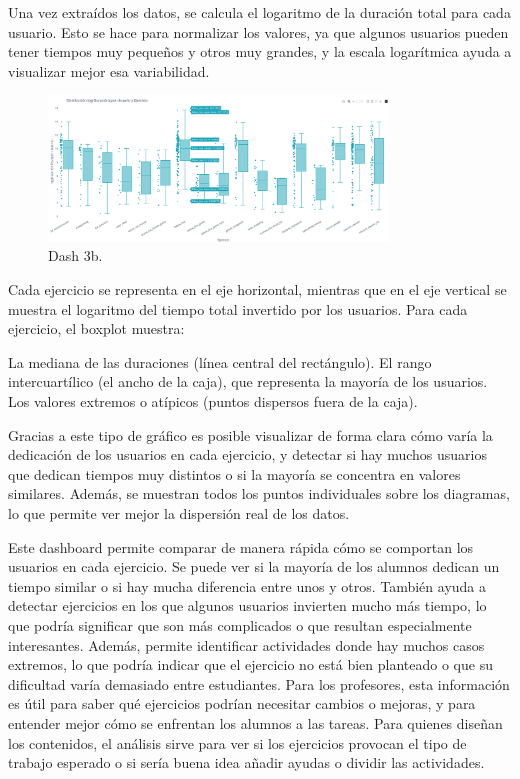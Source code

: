 \documentclass[a4paper, 12pt]{book}
\begin{document}
Una vez extraídos los datos, se calcula el logaritmo de la duración total para cada usuario. Esto se hace para normalizar los valores, ya que algunos usuarios pueden tener tiempos muy pequeños y otros muy grandes, y la escala logarítmica ayuda a visualizar mejor esa variabilidad.

\begin{figure}
  \centering
  \includegraphics[width=9cm, keepaspectratio]{img/3bb.png}
  \caption{Dash 3b.}\label{fig:3b}
\end{figure}

Cada ejercicio se representa en el eje horizontal, mientras que en el eje vertical se muestra el logaritmo del tiempo total invertido por los usuarios. Para cada ejercicio, el boxplot muestra:

La mediana de las duraciones (línea central del rectángulo).
El rango intercuartílico (el ancho de la caja), que representa la mayoría de los usuarios.
Los valores extremos o atípicos (puntos dispersos fuera de la caja).

Gracias a este tipo de gráfico es posible visualizar de forma clara cómo varía la dedicación de los usuarios en cada ejercicio, y detectar si hay muchos usuarios que dedican tiempos muy distintos o si la mayoría se concentra en valores similares. Además, se muestran todos los puntos individuales sobre los diagramas, lo que permite ver mejor la dispersión real de los datos.

Este dashboard permite comparar de manera rápida cómo se comportan los usuarios en cada ejercicio. Se puede ver si la mayoría de los alumnos dedican un tiempo similar o si hay mucha diferencia entre unos y otros. También ayuda a detectar ejercicios en los que algunos usuarios invierten mucho más tiempo, lo que podría significar que son más complicados o que resultan especialmente interesantes. Además, permite identificar actividades donde hay muchos casos extremos, lo que podría indicar que el ejercicio no está bien planteado o que su dificultad varía demasiado entre estudiantes. Para los profesores, esta información es útil para saber qué ejercicios podrían necesitar cambios o mejoras, y para entender mejor cómo se enfrentan los alumnos a las tareas. Para quienes diseñan los contenidos, el análisis sirve para ver si los ejercicios provocan el tipo de trabajo esperado o si sería buena idea añadir ayudas o dividir las actividades.
\end{document}
